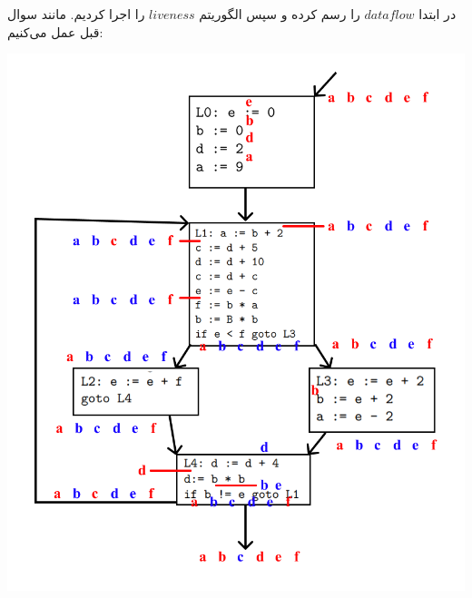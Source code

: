 در ابتدا $data flow$ را رسم کرده و سپس الگوریتم $liveness$ را اجرا کردیم. مانند سوال قبل عمل می‌کنیم:

\qquad\includegraphics[width=0.8\linewidth]{figs/4.png}